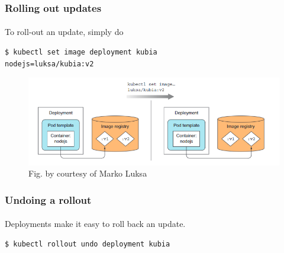 \begin{frame}[fragile]
	\frametitle{Rolling out updates}
	\framesubtitle{}
	To roll-out an update, simply do
	\begin{lstlisting}[numbers=none, basicstyle=\ttfamily]
$ kubectl set image deployment kubia
nodejs=luksa/kubia:v2
	\end{lstlisting}
	\begin{figure}[htbp!]
		\includegraphics[width=1\textwidth]{figures/9_9.png}
		\caption{Fig. by courtesy of Marko Luksa\cite{Luksa2018}}
		\label{fig:}
	\end{figure}
\end{frame}


\begin{frame}[fragile]
	\frametitle{Undoing a rollout}
	\framesubtitle{}
	Deployments make it easy to roll back an update.
	\begin{lstlisting}[numbers=none, basicstyle=\ttfamily]
$ kubectl rollout undo deployment kubia
	\end{lstlisting}
\end{frame}

